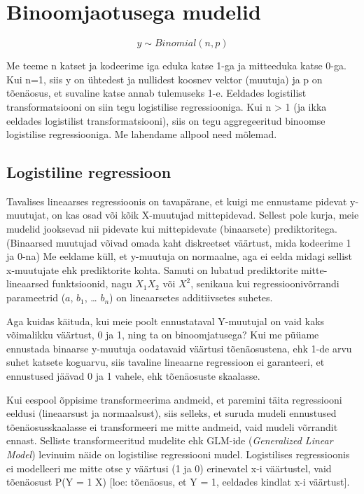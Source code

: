 \documentclass[]{book}
\begin{document}
\hypertarget{binoomjaotusega-mudelid}{%
\section{Binoomjaotusega mudelid}\label{binoomjaotusega-mudelid}}

\[y \sim Binomial(n, p)\]

Me teeme n katset ja kodeerime iga eduka katse 1-ga ja mitteeduka katse 0-ga. Kui n=1, siis y on ühtedest ja nullidest koosnev vektor (muutuja) ja p on tõenäosus, et suvaline katse annab tulemuseks 1-e. Eeldades logistilist transformatsiooni on siin tegu logistilise regressiooniga.
Kui n \textgreater{} 1 (ja ikka eeldades logistilist transformatsiooni), siis on tegu aggregeeritud binoomse logistilise regressiooniga. Me lahendame allpool need mõlemad.

\hypertarget{logistiline-regressioon}{%
\subsection{Logistiline regressioon}\label{logistiline-regressioon}}

Tavalises lineaarses regressioonis on tavapärane, et kuigi me ennustame pidevat y-muutujat, on kas osad või kõik X-muutujad mittepidevad. Sellest pole kurja, meie mudelid jooksevad nii pidevate kui mittepidevate (binaarsete) prediktoritega. (Binaarsed muutujad võivad omada kaht diskreetset väärtust, mida kodeerime 1 ja 0-na) Me eeldame küll, et y-muutuja on normaalne, aga ei eelda midagi sellist x-muutujate ehk prediktorite kohta. Samuti on lubatud prediktorite mitte-lineaarsed funktsioonid, nagu \(X_1 X_2\) või \(X^2\), senikaua kui regressioonivõrrandi parameetrid (\(a\), \(b_1\), \ldots{} \(b_n\)) on lineaarsetes additiivsetes suhetes.

Aga kuidas käituda, kui meie poolt ennustataval Y-muutujal on vaid kaks võimalikku väärtust, 0 ja 1, ning ta on binoomjatusega? Kui me püüame ennustada binaarse y-muutuja oodatavaid väärtusi tõenäosustena, ehk 1-de arvu suhet katsete koguarvu, siis tavaline lineaarne regressioon ei garanteeri, et ennustused jäävad 0 ja 1 vahele, ehk tõenäosuste skaalasse.

Kui eespool õppisime transformeerima andmeid, et paremini täita regressiooni eeldusi (lineaarsust ja normaalsust), siis selleks, et suruda mudeli ennustused tõenäosusskaalasse ei transformeeri me mitte andmeid, vaid mudeli võrrandit ennast.
Selliste transformeeritud mudelite ehk GLM-ide (\emph{Generalized Linear Model}) levinuim näide on logistilise regressiooni mudel. Logistilises regressioonis ei modelleeri me mitte otse y väärtusi (1 ja 0) erinevatel x-i väärtustel, vaid tõenäosust P(Y = 1 \textbar{} X) {[}loe: tõenäosus, et Y = 1, eeldades kindlat x-i väärtust{]}.
\end{document}
